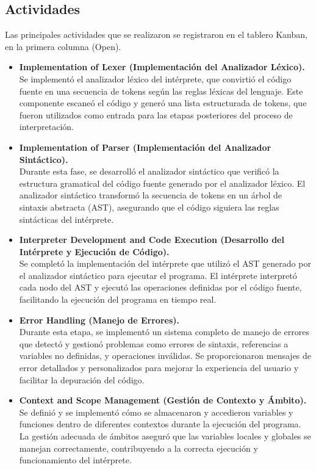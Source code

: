 \subsection{Actividades}
Las principales actividades que se realizaron se registraron en el tablero Kanban, en la primera columna (Open).

\begin{itemize}
  \item \textbf{Implementation of Lexer (Implementación del Analizador Léxico).} \\
  Se implementó el analizador léxico del intérprete, que convirtió el código fuente en una secuencia de tokens según las reglas léxicas del lenguaje. Este componente escaneó el código y generó una lista estructurada de tokens, que fueron utilizados como entrada para las etapas posteriores del proceso de interpretación.
  \item \textbf{Implementation of Parser (Implementación del Analizador Sintáctico).} \\
  Durante esta fase, se desarrolló el analizador sintáctico que verificó la estructura gramatical del código fuente generado por el analizador léxico. El analizador sintáctico transformó la secuencia de tokens en un árbol de sintaxis abstracta (AST), asegurando que el código siguiera las reglas sintácticas del intérprete.
  \item \textbf{Interpreter Development and Code Execution (Desarrollo del Intérprete y Ejecución de Código).} \\
  Se completó la implementación del intérprete que utilizó el AST generado por el analizador sintáctico para ejecutar el programa. El intérprete interpretó cada nodo del AST y ejecutó las operaciones definidas por el código fuente, facilitando la ejecución del programa en tiempo real. \\
  \item \textbf{Error Handling (Manejo de Errores).} \\
  Durante esta etapa, se implementó un sistema completo de manejo de errores que detectó y gestionó problemas como errores de sintaxis, referencias a variables no definidas, y operaciones inválidas. Se proporcionaron mensajes de error detallados y personalizados para mejorar la experiencia del usuario y facilitar la depuración del código.
  \item \textbf{Context and Scope Management (Gestión de Contexto y Ámbito).} \\
  Se definió y se implementó cómo se almacenaron y accedieron variables y funciones dentro de diferentes contextos durante la ejecución del programa. La gestión adecuada de ámbitos aseguró que las variables locales y globales se manejan correctamente, contribuyendo a la correcta ejecución y funcionamiento del intérprete.

\end{itemize}
